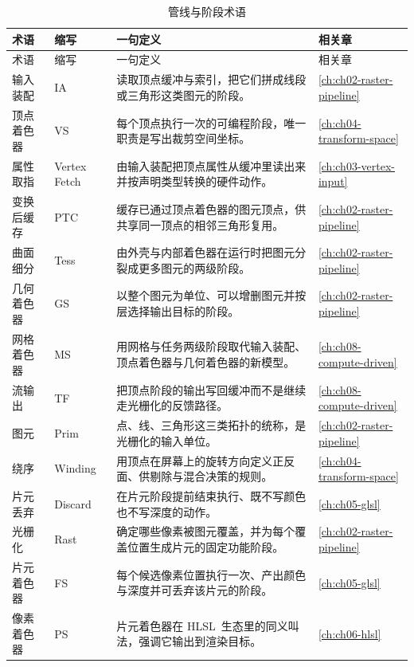 \documentclass[12pt,a4paper,fontset=fandol]{ctexbook}
\newcommand{\Lang}[1]{\textsf{#1}}
\newcommand{\HSL}{\Lang{HLSL}}
\begin{document}
\begin{longtable}{>{\raggedright\arraybackslash}p{}
                  >{\raggedright\arraybackslash\small}p{}
                  >{\raggedright\arraybackslash}p{}
                  >{\raggedright\arraybackslash}p{}}
\caption{管线与阶段术语}\label{tab:apA-pipeline} \\
\toprule
术语 & 缩写 & 一句定义 & 相关章 \\
\midrule
\endfirsthead
\toprule
术语 & 缩写 & 一句定义 & 相关章 \\
\midrule
\endhead
\bottomrule
\endfoot
输入装配 & IA & 读取顶点缓冲与索引，把它们拼成线段或三角形这类图元的阶段。 & \ref{ch:ch02-raster-pipeline} \\
顶点着色器 & VS & 每个顶点执行一次的可编程阶段，唯一职责是写出裁剪空间坐标。 & \ref{ch:ch04-transform-space} \\
属性取指 & Vertex Fetch & 由输入装配把顶点属性从缓冲里读出来并按声明类型转换的硬件动作。 & \ref{ch:ch03-vertex-input} \\
变换后缓存 & PTC & 缓存已通过顶点着色器的图元顶点，供共享同一顶点的相邻三角形复用。 & \ref{ch:ch02-raster-pipeline} \\
曲面细分 & Tess & 由外壳与内部着色器在运行时把图元分裂成更多图元的两级阶段。 & \ref{ch:ch02-raster-pipeline} \\
几何着色器 & GS & 以整个图元为单位、可以增删图元并按层选择输出目标的阶段。 & \ref{ch:ch02-raster-pipeline} \\
网格着色器 & MS & 用网格与任务两级阶段取代输入装配、顶点着色器与几何着色器的新模型。 & \ref{ch:ch08-compute-driven} \\
流输出 & TF & 把顶点阶段的输出写回缓冲而不是继续走光栅化的反馈路径。 & \ref{ch:ch08-compute-driven} \\
图元 & Prim & 点、线、三角形这三类拓扑的统称，是光栅化的输入单位。 & \ref{ch:ch02-raster-pipeline} \\
绕序 & Winding & 用顶点在屏幕上的旋转方向定义正反面、供剔除与混合决策的规则。 & \ref{ch:ch04-transform-space} \\
片元丢弃 & Discard & 在片元阶段提前结束执行、既不写颜色也不写深度的动作。 & \ref{ch:ch05-glsl} \\
光栅化 & Rast & 确定哪些像素被图元覆盖，并为每个覆盖位置生成片元的固定功能阶段。 & \ref{ch:ch02-raster-pipeline} \\
片元着色器 & FS & 每个候选像素位置执行一次、产出颜色与深度并可丢弃该片元的阶段。 & \ref{ch:ch05-glsl} \\
像素着色器 & PS & 片元着色器在 \HSL\ 生态里的同义叫法，强调它输出到渲染目标。 & \ref{ch:ch06-hlsl} \\

\end{longtable}
\end{document}
